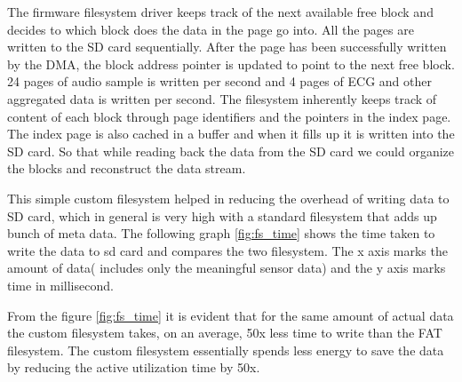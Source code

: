  The firmware filesystem driver keeps track of the next available free block and decides to which block does the data in the page go into. All the pages are written to the SD card sequentially. After the page has been successfully written by the DMA, the block address pointer is updated to point to the next free block. 24 pages of audio sample is written per second and 4 pages of ECG and other aggregated data is written per second. The filesystem inherently keeps track of content of each block through page identifiers and the pointers in the index page. The index page is also cached in a buffer and when it fills up it is written into the SD card. So that while reading back the data from the SD card we could organize the blocks and reconstruct the data stream.  

 This simple custom filesystem helped in reducing the overhead of writing data to SD card, which in general is very high with a standard filesystem that adds up bunch of meta data. The following graph \ref{fig:fs_time} shows the time taken to write the data to sd card and compares the two filesystem. The x axis marks the amount of data( includes only the meaningful sensor data) and the y axis marks time in millisecond.
{
\centering
{}\label{fig:fs_time}

}

 From the figure \ref{fig:fs_time} it is evident that for the same amount of actual data the custom filesystem takes, on an average, 50x less time to write than the FAT filesystem. The custom filesystem essentially spends less energy to save the data by reducing the active utilization time by 50x. 

